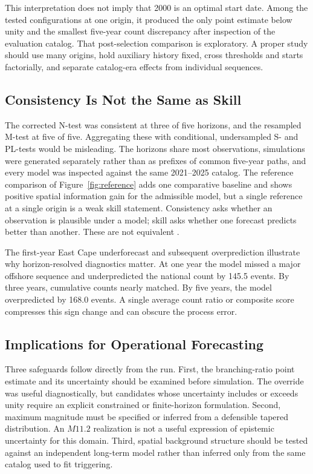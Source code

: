 \documentclass[12pt]{article}
\begin{document}
This interpretation does not imply that 2000 is an optimal start date. Among
the tested configurations at one origin, it produced the only point estimate
below unity and the smallest five-year count discrepancy after inspection of
the evaluation catalog. That post-selection comparison is exploratory. A
proper study should use many origins, hold auxiliary history fixed, cross
thresholds and starts factorially, and separate catalog-era effects from
individual sequences.

\subsection*{Consistency Is Not the Same as Skill}

The corrected N-test was consistent at three of five horizons, and the
resampled M-test at five of five. Aggregating these with conditional,
undersampled S- and PL-tests would be misleading. The horizons share most
observations, simulations were generated separately rather than as prefixes of
common five-year paths, and every model was inspected against the same
2021--2025 catalog. The reference comparison of
Figure~\ref{fig:reference} adds one comparative baseline and shows positive
spatial information gain for the admissible model, but a single reference at a
single origin is a weak skill statement.
Consistency asks whether an observation is plausible under a model; skill asks
whether one forecast predicts better than another. These are not equivalent
\citep{Zechar2010,Savran2022,Marzocchi2012}.

The first-year East Cape underforecast and subsequent overprediction illustrate
why horizon-resolved diagnostics matter. At one year the model missed a major
offshore sequence and underpredicted the national count by 145.5 events. By
three years, cumulative counts nearly matched. By five years, the model
overpredicted by 168.0 events. A single average count ratio or composite score
compresses this sign change and can obscure the process error.

\subsection*{Implications for Operational Forecasting}

Three safeguards follow directly from the run. First, the branching-ratio
point estimate and its uncertainty should be examined before simulation. The
override was useful diagnostically, but candidates whose uncertainty includes
or exceeds unity require an explicit constrained or finite-horizon
formulation. Second, maximum
magnitude must be specified or inferred from a defensible tapered distribution.
An $M11.2$ realization is not a useful expression of epistemic uncertainty for
this domain. Third, spatial background structure should be tested against an
independent long-term model rather than inferred only from the same catalog used
to fit triggering.
\end{document}

